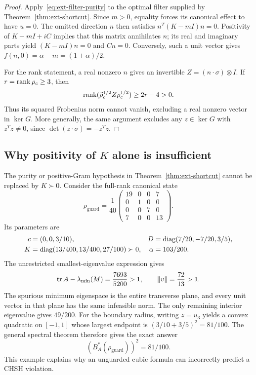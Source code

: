 \begin{proof}
Apply~\eqref{eq:ext-filter-purity} to the optimal filter supplied by
Theorem~\ref{thm:ext-shortcut}. Since $m>0$, equality forces its
canonical effect to have $u=0$. The omitted direction $n$ then satisfies
$n^T(K-mI)n=0$. Positivity of $K-mI+iC$ implies that this matrix
annihilates $n$; its real and imaginary parts yield
$(K-mI)n=0$ and $Cn=0$. Conversely, such a unit vector gives
$f(n,0)=\alpha-m=(1+\alpha)/2$.

For the rank statement, a real nonzero $n$ gives an invertible
$Z=(n\cdot\sigma)\otimes I$. If $r=\operatorname{rank}\rho_c\ge3$, then
\[
 \operatorname{rank}(\widetilde\rho_c^{1/2}Z\rho_c^{1/2})\ge2r-4>0.
\]
Thus its squared Frobenius norm cannot vanish, excluding a real
nonzero vector in $\ker G$. More generally, the same argument excludes
any $z\in\ker G$ with $z^Tz\ne0$, since
$\det(z\cdot\sigma)=-z^Tz$.
\end{proof}

\subsection{Why positivity of \(K\) alone is insufficient}

The purity or positive-Gram hypothesis in
Theorem~\ref{thm:ext-shortcut} cannot be replaced by $K\succ0$.
Consider the full-rank canonical state
\begin{equation}
 \rho_{\mathrm{guard}}=\frac1{40}
 \begin{pmatrix}
 19&0&0&7\\0&1&0&0\\0&0&7&0\\7&0&0&13
 \end{pmatrix}.
 \label{eq:ext-counterexample}
\end{equation}
Its parameters are
\[
 \begin{aligned}
 c&=(0,0,3/10),&
 D&=\operatorname{diag}(7/20,-7/20,3/5),\\
 K&=\operatorname{diag}(13/400,13/400,27/100)\succ0,&
 \alpha&=103/200.
 \end{aligned}
\]
The unrestricted smallest-eigenvalue expression gives
\[
 \operatorname{tr} A-\lambda_{\min}(M)=\frac{7693}{5200}>1,
 \qquad \left\lVert v\right\rVert=\frac{72}{13}>1.
\]
The spurious minimum eigenspace is the entire transverse plane, and
every unit vector in that plane has the same infeasible norm.
The only remaining interior eigenvalue gives $49/200$.
For the boundary radius, writing $z=u_3$ yields a convex quadratic
on $[-1,1]$ whose largest endpoint is $(3/10+3/5)^2=81/100$.
The general spectral theorem therefore gives the exact answer
\[
 \boxed{(B_A^*(\rho_{\mathrm{guard}}))^2=81/100.}
\]
This example explains why an unguarded cubic formula can incorrectly
predict a CHSH violation.

